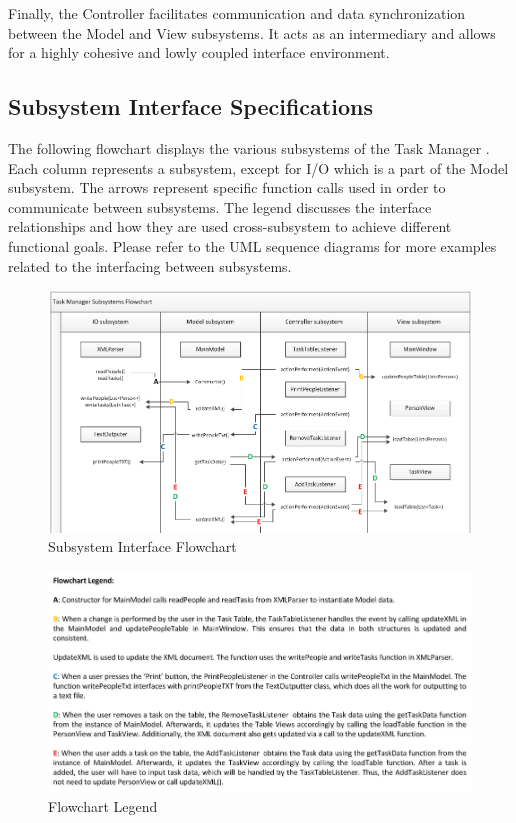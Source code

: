 \documentclass[12pt]{article}
\newcommand{\systemName}{Task Manager }
\begin{document}
Finally, the Controller facilitates communication and data synchronization between the Model and View subsystems. It acts as an intermediary and allows for a highly cohesive and lowly coupled interface environment. 

\subsection{Subsystem Interface Specifications}

The following flowchart displays the various subsystems of the \systemName. Each column represents a subsystem, except for I/O which is a part of the Model subsystem. The arrows represent specific function calls used in order to communicate between subsystems. The legend discusses the interface relationships and how they are used cross-subsystem to achieve different functional goals. Please refer to the UML sequence diagrams for more examples related to the interfacing between subsystems.

\begin{figure}[htbp]
\begin{center} \includegraphics[scale=.6]{Diagrams/subsystem_flowchart.png} \end{center}
\caption{Subsystem Interface Flowchart}
\label{fig:sub-flow-diagram2}
\end{figure}

\begin{figure}[htbp]
\begin{center} \includegraphics[scale=.65]{Diagrams/legend.png} \end{center}
\caption{Flowchart Legend}
\label{fig:legend}
\end{figure}
\end{document}
